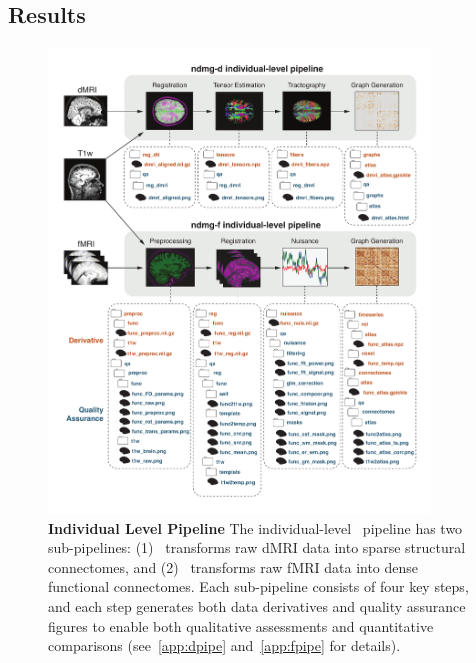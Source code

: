 \documentclass[11pt]{article}
\begin{document}
\begin{multicols}{2}
% 



\section{Results}



\begin{figure}[t!]
	\centering
	\includegraphics[width=0.9\textwidth]{./figs/ndmg_pipeline.pdf}
    \caption{\textbf{Individual Level Pipeline}
  The individual-level  \ndmg~pipeline has two sub-pipelines:  (1) \ndmgd~transforms raw dMRI data into sparse structural connectomes, and (2) \ndmgf~transforms raw fMRI data into dense functional connectomes.  Each sub-pipeline consists of four key steps, and each step generates both data derivatives and quality assurance figures to enable both qualitative assessments and quantitative comparisons (see~\ref{app:dpipe} and~\ref{app:fpipe} for details).  
}
	\label{fig:ndmgpipeline}
\end{figure}


\end{multicols}
\end{document}
